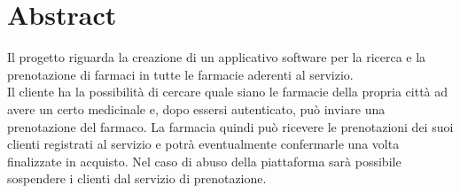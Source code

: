 \newpage
{}
\section{Abstract}

Il progetto riguarda la creazione di un applicativo software per la ricerca e
la prenotazione di farmaci in tutte le farmacie aderenti al servizio. \\
Il cliente ha la possibilità di cercare quale siano le farmacie della propria città ad
avere un certo medicinale e, dopo essersi autenticato, può inviare una
prenotazione del farmaco. La farmacia quindi può ricevere le prenotazioni dei
suoi clienti registrati al servizio e potrà eventualmente confermarle 
una volta finalizzate in acquisto. Nel caso di abuso della piattaforma sarà
possibile sospendere i clienti dal servizio di prenotazione.
